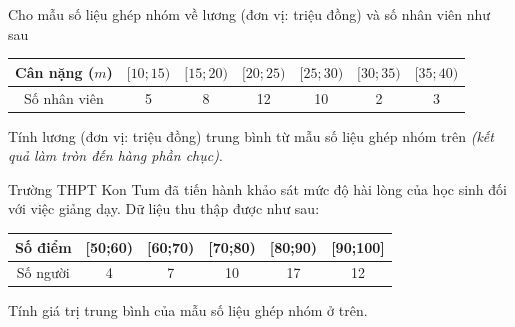 \begin{ex}%
	 Cho mẫu số liệu ghép nhóm về lương (đơn vị: triệu đồng) và số nhân viên như sau
	\begin{center}
		\begin{tabular}{|c|c|c|c|c|c|c|}
			\hline Cân nặng ($m$) &{$[10;15)$}&{$[15;20)$}&{$[20;25)$}&{$[25;30)$}&{$[30;35)$}&{$[35;40)$}\\
			\hline Số nhân viên & 5 & 8 & 12 & 10 & 2 & 3 \\
			\hline
		\end{tabular}
	\end{center}
	Tính lương (đơn vị: triệu đồng) trung bình từ mẫu số liệu ghép nhóm trên {\it (kết quả làm tròn đến hàng phần chục)}.
\end{ex}

\begin{ex}%
	Trường THPT Kon Tum đã tiến hành khảo sát mức độ hài lòng của học sinh đối với việc giảng dạy. Dữ liệu thu thập được như sau:
	\begin{center}
		\begin{tabular}{|c|c|c|c|c|c|}
			\hline
			Số điểm &  [50;60) & [60;70) & [70;80) & [80;90) & [90;100]  \\
			\hline
			Số người & 4 & 7 & 10 & 17 & 12 \\
			\hline
		\end{tabular}
	\end{center}
	Tính giá trị trung bình của mẫu số liệu ghép nhóm ở trên.
\end{ex}

